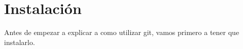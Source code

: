 \section{Instalación}
Antes de empezar a explicar a como utilizar git, vamos primero a tener que instalarlo.


